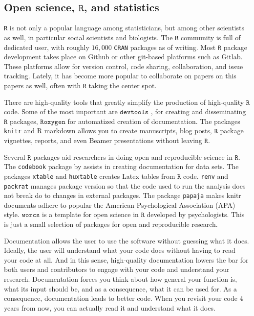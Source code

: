 \subsection{Open science, $\mathtt{R}$, and statistics}

\texttt{R} is not only a popular language among statisticians, but among other scientists as well, in particular social scientists and biologists. The \texttt{R} community is full of dedicated user, with roughly $16,000$ \texttt{CRAN} packages as of writing. Most \texttt{R} package development takes place on Github or other git-based platforms such as Gitlab. These platforms allow for version control, code sharing, collaboration, and issue tracking. Lately, it has become more popular to collaborate on papers on this papers as well, often with \texttt{R} taking the center spot.

There are high-quality tools that greatly simplify the production of high-quality $\mathtt{R}$ code. Some of the most important are $\texttt{devtools}$ \parencite{devtools}, for creating and disseminating $\mathtt{R}$ packages, $\mathtt{Roxygen}$ \parencite{roxygen2} for automatized creation of documentation. The packages \texttt{knitr} \parencite{Xie2014} and R markdown allows you to create manuscripts, blog posts, $\mathtt{R}$ package vignettes, reports, and even Beamer presentations without leaving $\mathtt{R}$.

Several $\mathtt{R}$ packages aid researchers in doing open and reproducible science in $\mathtt{R}$. The \texttt{codebook} package by \textcite{Arslan2019-tg} assists in creating documentation for data sets. The packages \texttt{xtable} \parencite{xtable} and \texttt{huxtable} \parencite{huxtable} creates Latex tables from $\mathtt{R}$ code. \texttt{renv} \parencite{renv} and \texttt{packrat} \parencite{packrat} manages package version so that the code used to run the analysis does not break do to changes in external packages. The package \texttt{papaja} \parencite{papaja} makes knitr documents adhere to popular the American Psychological Association (APA) style. $\mathtt{worcs}$ \parencite{Van_Lissa2020-sb} is a template for open science in $\mathtt{R}$ developed by psychologists. This is just a small selection of packages for open and reproducible research.

Documentation allows the user to use the software without guessing what it does. Ideally, the user will understand what your code does without having to read your code at all. And in this sense, high-quality documentation lowers the bar for both users and contributors to engage with your code and understand your research. Documentation forces you think about how general your function is, what its input should be, and as a consequence, what it can be used for. As a consequence, documentation leads to better code. When you revisit your code $4$ years from now, you can actually read it and understand what it does. 

